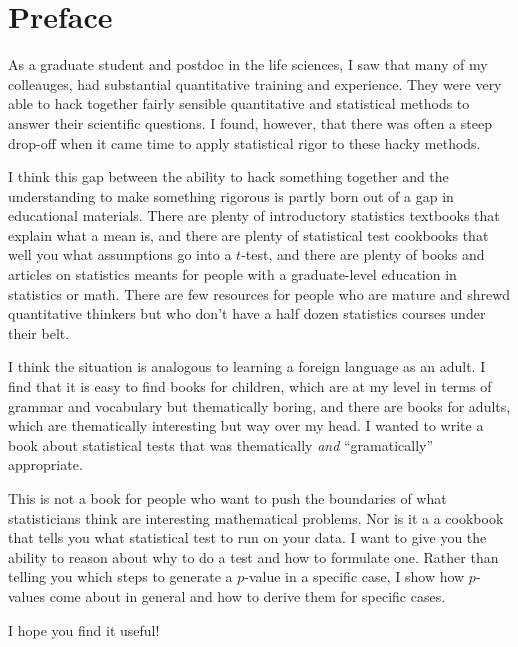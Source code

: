 
\chapter{Preface}

As a graduate student and postdoc in the life sciences, I saw that many of my
colleauges, had substantial quantitative training and experience. They were
very able to hack together fairly sensible quantitative and statistical methods
to answer their scientific questions. I found, however, that there was often a
steep drop-off when it came time to apply statistical rigor to these hacky
methods.

I think this gap between the ability to hack something together and the
understanding to make something rigorous is partly born out of a gap in
educational materials. There are plenty of introductory statistics
textbooks that explain what a mean is, and there are plenty of statistical
test cookbooks that well you what assumptions go into a $t$-test, and
there are plenty of books and articles on statistics meants for people
with a graduate-level education in statistics or math. There are few
resources for people who are mature and shrewd quantitative thinkers but
who don't have a half dozen statistics courses under their belt.

I think the situation is analogous to learning a foreign language as an
adult. I find that it is easy to find books for children, which are at my
level in terms of grammar and vocabulary but thematically boring, and
there are books for adults, which are thematically interesting but way
over my head. I wanted to write a book about statistical tests that was
thematically \emph{and} ``gramatically'' appropriate.

This is not a book for people who want to push the boundaries of what
statisticians think are interesting mathematical problems. Nor is it
a a cookbook that tells you what statistical test to run on your data.
I want to give you the ability to reason about why to do a test and how to
formulate one. Rather than telling you which steps to generate a $p$-value
in a specific case, I show how $p$-values come about in general and how to
derive them for specific cases.

I hope you find it useful!
